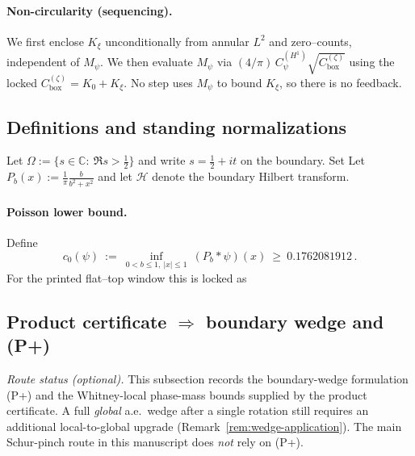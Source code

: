 \documentclass[11pt]{article}
\theoremstyle{definition}
\theoremstyle{remark}
\theoremstyle{definition}
\newcommand{\C}{\mathbb{C}}
\newcommand{\Poisson}{P}
\begin{document}
\paragraph{Non-circularity (sequencing).}
We first enclose \(K_\xi\) unconditionally from annular $L^2$ and zero–counts, independent of \(M_\psi\). We then evaluate \(M_\psi\) via \((4/\pi)\,C_\psi^{(H^1)}\sqrt{C_{\mathrm{box}}^{(\zeta)}}\) using the locked \(C_{\mathrm{box}}^{(\zeta)}=K_0+K_\xi\). No step uses \(M_\psi\) to bound \(K_\xi\), so there is no feedback.

\subsection*{Definitions and standing normalizations}

Let $\Omega:=\{s\in\C:\ \Re s>\tfrac12\}$ and write $s=\tfrac12+it$ on the boundary.
Set
Let $\Poisson_b(x):=\frac{1}{\pi}\frac{b}{b^2+x^2}$ and let $\mathcal H$ denote the boundary Hilbert transform.

\paragraph{Poisson lower bound.}
Define
\[
 c_0(\psi)\ :=\ \inf_{0<b\le 1,\ |x|\le 1}\ (\Poisson_{b}*\psi)(x)\ \ge\ 0.1762081912\,.
\]
For the printed flat--top window this is locked as

\subsection*{Product certificate $\Rightarrow$ boundary wedge and (P+)}
\noindent\textit{Route status (optional).} This subsection records the boundary-wedge formulation \textup{(P+)} and the Whitney-local phase-mass bounds supplied by the product certificate. A full \emph{global} a.e.\ wedge after a single rotation still requires an additional local-to-global upgrade (Remark~\ref{rem:wedge-application}). The main Schur-pinch route in this manuscript does \emph{not} rely on \textup{(P+)}.
\end{document}
